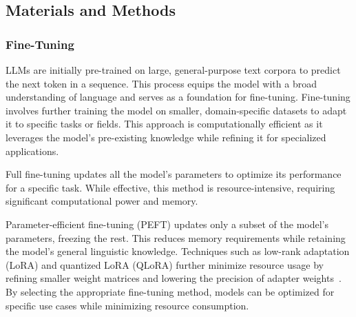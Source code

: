 \subsection{Materials and Methods}
\label{subsec:materials-and-methods-rag}

\subsubsection{Fine-Tuning}
\glspl{LLM} are initially pre-trained on large, general-purpose text corpora to predict the next token in a sequence.
%
This process equips the model with a broad understanding of language and serves as a foundation for fine-tuning.
%
Fine-tuning involves further training the model on smaller, domain-specific datasets to adapt it to specific tasks or fields.
%
This approach is computationally efficient as it leverages the model's pre-existing knowledge while refining it for specialized applications.

Full fine-tuning updates all the model's parameters to optimize its performance for a specific task.
%
While effective, this method is resource-intensive, requiring significant computational power and memory.

Parameter-efficient fine-tuning (PEFT) updates only a subset of the model's parameters, freezing the rest.
%
This reduces memory requirements while retaining the model's general linguistic knowledge.
%
Techniques such as low-rank adaptation (LoRA) and quantized LoRA (QLoRA) further minimize resource usage by refining smaller weight matrices and lowering the precision of adapter weights~\cite{DBLP:conf/iclr/HuSWALWWC22,DBLP:conf/nips/DettmersPHZ23}.
%
By selecting the appropriate fine-tuning method, models can be optimized for specific use cases while minimizing resource consumption.

